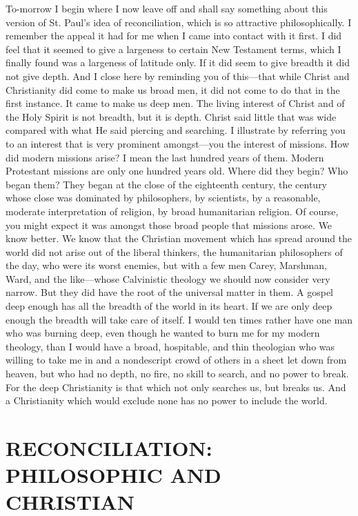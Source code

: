 \documentclass[12pt,letterpaper,oneside]{book}
\begin{document}
To-morrow I begin where I now leave off 
and shall say something about this version of 
St. Paul's idea of reconciliation, which is so 
attractive philosophically. I remember the 
appeal it had for me when I came into contact 
with it first. I did feel that it seemed to give 
a largeness to certain New Testament terms, 
which I finally found was a largeness of latitude 
only. If it did seem to give breadth it 
did not give depth. And I close here by reminding 
you of this---that while Christ and 
Christianity did come to make us broad men, 
it did not come to do that in the first instance. 
It came to make us deep men. The living 
interest of Christ and of the Holy Spirit is not 
breadth, but it is depth. Christ said little 
that was wide compared with what He said 
piercing and searching. I illustrate by referring 
you to an interest that is very prominent 
amongst---you the interest of missions. How 
did modern missions arise? I mean the last 
hundred years of them. Modern Protestant 
missions are only one hundred years old. 
Where did they begin? Who began them? 
They began at the close of the eighteenth 
century, the century whose close was dominated 
by philosophers, by scientists, by a 
reasonable, moderate interpretation of religion, 
by broad humanitarian religion. Of course, 
you might expect it was amongst those broad 
people that missions arose. We know better. 
We know that the Christian movement which 
has spread around the world did not arise out 
of the liberal thinkers, the humanitarian philosophers 
of the day, who were its worst enemies, 
but with a few men Carey, Marshman, Ward,
and the like---whose Calvinistic theology we 
should now consider very narrow. But they did 
have the root of the universal matter in them. 
A gospel deep enough has all the breadth of the 
world in its heart. If we are only deep enough 
the breadth will take care of itself. I would 
ten times rather have one man who was burning 
deep, even though he wanted to burn me 
for my modern theology, than I would have a 
broad, hospitable, and thin theologian who was 
willing to take me in and a nondescript crowd 
of others in a sheet let down from heaven, 
but who had no depth, no fire, no skill to 
search, and no power to break. For the deep 
Christianity is that which not only searches 
us, but breaks us. And a Christianity which 
would exclude none has no power to include 
the world. 


\chapter{RECONCILIATION: PHILOSOPHIC 
AND CHRISTIAN}
\end{document}
